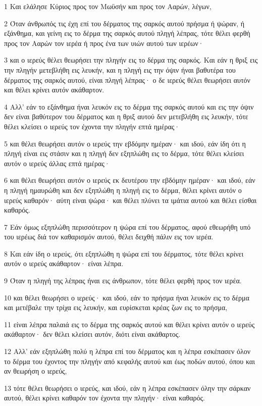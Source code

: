 \par 1 Και ελάλησε Κύριος προς τον Μωϋσήν και προς τον Ααρών, λέγων,
\par 2 Όταν άνθρωπός τις έχη επί του δέρματος της σαρκός αυτού πρήσμα ή ψώραν, ή εξάνθημα, και γείνη εις το δέρμα της σαρκός αυτού πληγή λέπρας, τότε θέλει φερθή προς τον Ααρών τον ιερέα ή προς ένα των υιών αυτού των ιερέων·
\par 3 και ο ιερεύς θέλει θεωρήσει την πληγήν εις το δέρμα της σαρκός. Και εάν η θριξ εις την πληγήν μετεβλήθη εις λευκήν, και η πληγή εις την όψιν ήναι βαθυτέρα του δέρματος της σαρκός αυτού, είναι πληγή λέπρας· ο δε ιερεύς θέλει θεωρήσει αυτόν και θέλει κρίνει αυτόν ακάθαρτον.
\par 4 Αλλ' εάν το εξάνθημα ήναι λευκόν εις το δέρμα της σαρκός αυτού και εις την όψιν δεν είναι βαθύτερον του δέρματος και η θριξ αυτού δεν μετεβλήθη εις λευκήν, τότε θέλει κλείσει ο ιερεύς τον έχοντα την πληγήν επτά ημέρας·
\par 5 και θέλει θεωρήσει αυτόν ο ιερεύς την εβδόμην ημέραν· και ιδού, εάν ίδη ότι η πληγή είναι εις στάσιν και η πληγή δεν εξηπλώθη εις το δέρμα, τότε θέλει κλείσει αυτόν ο ιερεύς άλλας επτά ημέρας·
\par 6 και θέλει θεωρήσει αυτόν ο ιερεύς εκ δευτέρου την εβδόμην ημέραν· και ιδού, εάν η πληγή ημαυρώθη και δεν εξηπλώθη η πληγή εις το δέρμα, θέλει κρίνει αυτόν ο ιερεύς καθαρόν· αύτη είναι ψώρα· και θέλει πλύνει τα ιμάτια αυτού και θέλει είσθαι καθαρός.
\par 7 Εάν όμως εξηπλώθη περισσότερον η ψώρα επί του δέρματος, αφού εθεωρήθη υπό του ιερέως διά τον καθαρισμόν αυτού, θέλει δειχθή πάλιν εις τον ιερέα.
\par 8 Και εάν ίδη ο ιερεύς, ότι εξηπλώθη η ψώρα επί του δέρματος, τότε θέλει κρίνει αυτόν ο ιερεύς ακάθαρτον· είναι λέπρα.
\par 9 Όταν η πληγή της λέπρας ήναι εις άνθρωπον, τότε θέλει φερθή προς τον ιερέα.
\par 10 και θέλει θεωρήσει ο ιερεύς· και ιδού, εάν το πρήσμα ήναι λευκόν εις το δέρμα και μετέβαλε την τρίχα εις λευκήν, και ευρίσκεται κρέας ζων εις το πρήσμα,
\par 11 είναι λέπρα παλαιά εις το δέρμα της σαρκός αυτού και θέλει κρίνει αυτόν ο ιερεύς ακάθαρτον· δεν θέλει κλείσει αυτόν, διότι είναι ακάθαρτος.
\par 12 Αλλ' εάν εξηπλώθη πολύ η λέπρα επί του δέρματος και η λέπρα εσκέπασεν όλον το δέρμα του έχοντος την πληγήν από κεφαλής αυτού και έως ποδών αυτού, όπου και αν θεωρήση ο ιερεύς,
\par 13 τότε θέλει θεωρήσει ο ιερεύς, και ιδού, εάν η λέπρα εσκέπασεν όλην την σάρκαν αυτού, θέλει κρίνει καθαρόν τον έχοντα την πληγήν· είναι καθαρός.
